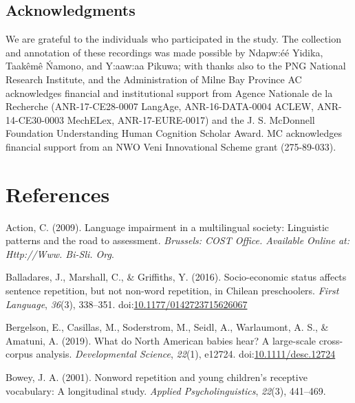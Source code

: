\documentclass[english,,man,floatsintext]{apa6}
\begin{document}
\newpage

\subsection{Acknowledgments}\label{acknowledgments}

We are grateful to the individuals who participated in the study. The
collection and annotation of these recordings was made possible by
Ndapw:éé Yidika, Taakêmê Ńamono, and Y:aaw:aa Pikuwa; with thanks also
to the PNG National Research Institute, and the Administration of Milne
Bay Province AC acknowledges financial and institutional support from
Agence Nationale de la Recherche (ANR-17-CE28-0007 LangAge,
ANR-16-DATA-0004 ACLEW, ANR-14-CE30-0003 MechELex, ANR-17-EURE-0017) and
the J. S. McDonnell Foundation Understanding Human Cognition Scholar
Award. MC acknowledges financial support from an NWO Veni Innovational
Scheme grant (275-89-033).

\section{References}\label{references}

\setlength{\parindent}{-0.5in} \setlength{\leftskip}{0.5in}

\hypertarget{refs}{}
\hypertarget{ref-is08042009language}{}
Action, C. (2009). Language impairment in a multilingual society:
Linguistic patterns and the road to assessment. \emph{Brussels: COST
Office. Available Online at: Http://Www. Bi-Sli. Org}.

\hypertarget{ref-balladares2016socio}{}
Balladares, J., Marshall, C., \& Griffiths, Y. (2016). Socio-economic
status affects sentence repetition, but not non-word repetition, in
Chilean preschoolers. \emph{First Language}, \emph{36}(3), 338--351.
doi:\href{https://doi.org/10.1177/0142723715626067}{10.1177/0142723715626067}

\hypertarget{ref-bergelsoncasillas2019what}{}
Bergelson, E., Casillas, M., Soderstrom, M., Seidl, A., Warlaumont, A.
S., \& Amatuni, A. (2019). What do North American babies hear? A
large-scale cross-corpus analysis. \emph{Developmental Science},
\emph{22}(1), e12724.
doi:\href{https://doi.org/10.1111/desc.12724}{10.1111/desc.12724}

\hypertarget{ref-bowey2001nonword}{}
Bowey, J. A. (2001). Nonword repetition and young children's receptive
vocabulary: A longitudinal study. \emph{Applied Psycholinguistics},
\emph{22}(3), 441--469.
\end{document}
